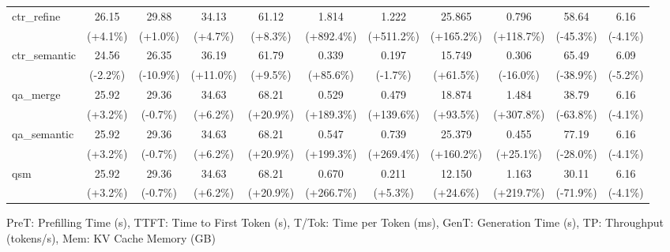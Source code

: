 \begin{table}[t]
{\begin{tabular}{l|cccccccccc}
    ctr\_refine & 26.15 & 29.88 & 34.13 & 61.12 & 1.814 & 1.222 & 25.865 & 0.796 & 58.64 & 6.16 \\
     & {\tiny\color{red!70!black}(+4.1\%)} & {\tiny\color{red!70!black}(+1.0\%)} & {\tiny\color{red!70!black}(+4.7\%)} & {\tiny\color{red!70!black}(+8.3\%)} & {\tiny\color{red!70!black}(+892.4\%)} & {\tiny\color{red!70!black}(+511.2\%)} & {\tiny\color{red!70!black}(+165.2\%)} & {\tiny\color{red!70!black}(+118.7\%)} & {\tiny\color{red!70!black}(-45.3\%)} & {\tiny\color{green!60!black}(-4.1\%)} \\
    ctr\_semantic & 24.56 & 26.35 & 36.19 & 61.79 & 0.339 & 0.197 & 15.749 & 0.306 & 65.49 & 6.09 \\
     & {\tiny\color{green!60!black}(-2.2\%)} & {\tiny\color{green!60!black}(-10.9\%)} & {\tiny\color{red!70!black}(+11.0\%)} & {\tiny\color{red!70!black}(+9.5\%)} & {\tiny\color{red!70!black}(+85.6\%)} & {\tiny\color{green!60!black}(-1.7\%)} & {\tiny\color{red!70!black}(+61.5\%)} & {\tiny\color{green!60!black}(-16.0\%)} & {\tiny\color{red!70!black}(-38.9\%)} & {\tiny\color{green!60!black}(-5.2\%)} \\
    qa\_merge & 25.92 & 29.36 & 34.63 & 68.21 & 0.529 & 0.479 & 18.874 & 1.484 & 38.79 & 6.16 \\
     & {\tiny\color{red!70!black}(+3.2\%)} & {\tiny\color{green!60!black}(-0.7\%)} & {\tiny\color{red!70!black}(+6.2\%)} & {\tiny\color{red!70!black}(+20.9\%)} & {\tiny\color{red!70!black}(+189.3\%)} & {\tiny\color{red!70!black}(+139.6\%)} & {\tiny\color{red!70!black}(+93.5\%)} & {\tiny\color{red!70!black}(+307.8\%)} & {\tiny\color{red!70!black}(-63.8\%)} & {\tiny\color{green!60!black}(-4.1\%)} \\
    qa\_semantic & 25.92 & 29.36 & 34.63 & 68.21 & 0.547 & 0.739 & 25.379 & 0.455 & 77.19 & 6.16 \\
     & {\tiny\color{red!70!black}(+3.2\%)} & {\tiny\color{green!60!black}(-0.7\%)} & {\tiny\color{red!70!black}(+6.2\%)} & {\tiny\color{red!70!black}(+20.9\%)} & {\tiny\color{red!70!black}(+199.3\%)} & {\tiny\color{red!70!black}(+269.4\%)} & {\tiny\color{red!70!black}(+160.2\%)} & {\tiny\color{red!70!black}(+25.1\%)} & {\tiny\color{red!70!black}(-28.0\%)} & {\tiny\color{green!60!black}(-4.1\%)} \\
    qsm & 25.92 & 29.36 & 34.63 & 68.21 & 0.670 & 0.211 & 12.150 & 1.163 & 30.11 & 6.16 \\
     & {\tiny\color{red!70!black}(+3.2\%)} & {\tiny\color{green!60!black}(-0.7\%)} & {\tiny\color{red!70!black}(+6.2\%)} & {\tiny\color{red!70!black}(+20.9\%)} & {\tiny\color{red!70!black}(+266.7\%)} & {\tiny\color{red!70!black}(+5.3\%)} & {\tiny\color{red!70!black}(+24.6\%)} & {\tiny\color{red!70!black}(+219.7\%)} & {\tiny\color{red!70!black}(-71.9\%)} & {\tiny\color{green!60!black}(-4.1\%)} \\
    \bottomrule
    \end{tabular}%
    }
    \vspace{0.1cm}
    \footnotesize{PreT: Prefilling Time (s), TTFT: Time to First Token (s), T/Tok: Time per Token (ms), GenT: Generation Time (s), TP: Throughput (tokens/s), Mem: KV Cache Memory (GB)}
\end{table}

